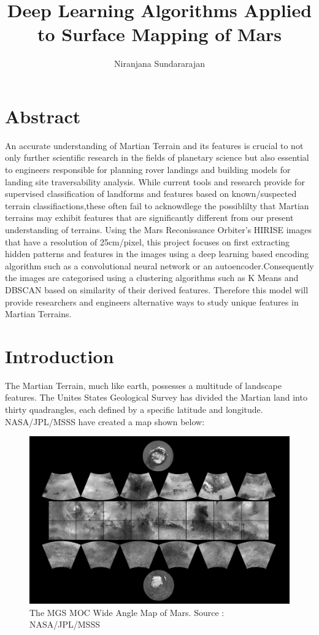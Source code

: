 \documentclass[project-plan]{report-template}
\title{Deep Learning Algorithms Applied to Surface Mapping of Mars}
\author{Niranjana Sundararajan}
\begin{document}
\maketitlepage  %

\section*{Abstract}

An accurate understanding of Martian Terrain and its features is crucial to not only further scientific research in the fields of planetary science but also essential to engineers responsible for planning rover landings and building models for landing site traversability analysis. While current tools and research provide for supervised classification of landforms and features based on known/suspected terrain classifiactions,these often fail to acknowdlege the possiblilty that Martian terrains may exhibit features that are significantly different from our present understanding of terrains. 
Using the Mars Reconissance Orbiter's HIRISE images that have a resolution of 25cm/pixel, this project focuses on first extracting hidden patterns and features in the images using a deep learning based encoding algorithm such as a convolutional neural network or an autoencoder.Consequently the images are categorised using a clustering algorithms such as K Means and DBSCAN based on similarity of their derived features.
Therefore this model will provide researchers and engineers alternative ways to study unique features in Martian Terrains. 


\section{Introduction}

The Martian Terrain, much like earth, possesses a multitude of landscape features. The Unites States Geological Survey has divided the Martian land into thirty quadrangles, each defined by a specific latitude and longitude. NASA/JPL/MSSS have created a map shown below:
\begin{figure}[h]
    \begin{center}
        \includegraphics[width=1\textwidth]{quadrangles-NASA-JPL-MSSS.jpg}
    \end{center}
    \caption{\label{fig:Martian Quadrangles} The MGS MOC Wide Angle Map of Mars. Source : NASA/JPL/MSSS }
\end{figure}
\end{document}
